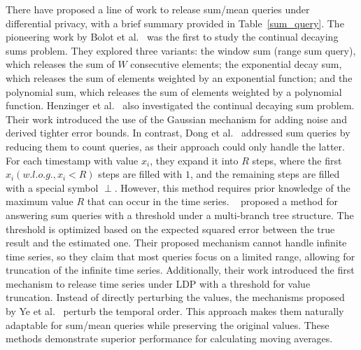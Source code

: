 There have proposed a line of work to release sum/mean queries under differential privacy, with a brief summary provided in Table~\ref{sum_query}.
The pioneering work by Bolot et al.~\cite{bolot2013private} was the first to study the continual decaying sums problem. They explored three variants: the window sum (range sum query), which releases the sum of $W$ consecutive elements; the exponential decay sum, which releases the sum of elements weighted by an exponential function; and the polynomial sum, which releases the sum of elements weighted by a polynomial function. 
Henzinger et al.~\cite{henzinger2024unifying} also investigated the continual decaying sum problem. Their work introduced the use of the Gaussian mechanism for adding noise and derived tighter error bounds. 
In contrast, Dong et al.~\cite{dong2023continual} addressed sum queries by reducing them to count queries, as their approach could only handle the latter. For each timestamp with value $x_i$, they expand it into $R$ steps, where the first $x_i (w.l.o.g., x_i<R)$ steps are filled with $1$, and the remaining steps are filled with a special symbol $\perp$. However, this method requires prior knowledge of the maximum value $R$ that can occur in the time series.
~\cite{wang2021continuous} proposed a method for answering sum queries with a threshold under a multi-branch tree structure. The threshold is optimized based on the expected squared error between the true result and the estimated one.   Their proposed mechanism cannot handle infinite time series, so they claim that most queries focus on a limited range, allowing for truncation of the infinite time series. Additionally, their work introduced the first mechanism to release time series under LDP with a threshold for value truncation. 
Instead of directly perturbing the values, the mechanisms proposed by Ye et al.~\cite{ye2021beyond, ye2023stateful} perturb the temporal order. This approach makes them naturally adaptable for sum/mean queries while preserving the original values. These methods demonstrate superior performance for calculating moving averages.

